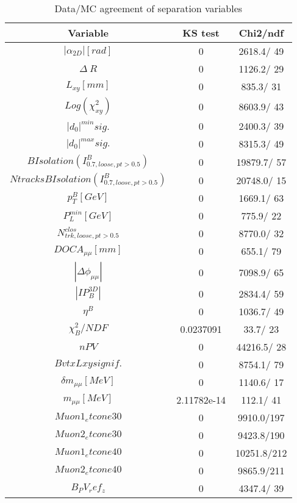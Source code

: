 \documentclass{article}
\begin{document}
\begin{table}[htbp]
\caption{\label{tab:sepVars}Data/MC agreement of separation variables}
\begin{center}
\begin{tabular}{c|c|c}
Variable & KS test & Chi2/ndf \\
\hline
$|\alpha_{2D}| [rad]$ & 0 & 2618.4/ 49\\
\hline
$\Delta~R$ & 0 & 1126.2/ 29\\
\hline
$L_{xy} [mm]$ & 0 & 835.3/ 31\\
\hline
$Log(\chi^{2}_{xy})$ & 0 & 8603.9/ 43\\
\hline
$|d_{0}|^{min} sig.$ & 0 & 2400.3/ 39\\
\hline
$|d_{0}|^{max} sig.$ & 0 & 8315.3/ 49\\
\hline
$B Isolation (I^{B}_{0.7, loose, pt>0.5})$ & 0 & 19879.7/ 57\\
\hline
$Ntracks B Isolation (I^{B}_{0.7, loose, pt>0.5})$ & 0 & 20748.0/ 15\\
\hline
$p_{T}^{B} [GeV]$ & 0 & 1669.1/ 63\\
\hline
$P^{min}_{L} [GeV]$ & 0 & 775.9/ 22\\
\hline
$N^{clos}_{trk, loose, pt>0.5}$ & 0 & 8770.0/ 32\\
\hline
$DOCA_{\mu\mu} [mm]$ & 0 & 655.1/ 79\\
\hline
$|\Delta\phi_{\mu\mu}|$ & 0 & 7098.9/ 65\\
\hline
$|IP_{B}^{3D}|$ & 0 & 2834.4/ 59\\
\hline
$\eta^{B}$ & 0 & 1036.7/ 49\\
\hline
$\chi^{2}_{B}/NDF$ & 0.0237091 &  33.7/ 23\\
\hline
$nPV$ & 0 & 44216.5/ 28\\
\hline
$BvtxLxy signif.$ & 0 & 8754.1/ 79\\
\hline
$\delta m_{\mu\mu} [MeV]$ & 0 & 1140.6/ 17\\
\hline
$m_{\mu\mu} [MeV]$ & 2.11782e-14 & 112.1/ 41\\
\hline
$Muon1_etcone30$ & 0 & 9910.0/197\\
\hline
$Muon2_etcone30$ & 0 & 9423.8/190\\
\hline
$Muon1_etcone40$ & 0 & 10251.8/212\\
\hline
$Muon2_etcone40$ & 0 & 9865.9/211\\
\hline
$B_PV_ref_z$ & 0 & 4347.4/ 39\\
\hline
\end{tabular}
\end{center}
\end{table}
\end{document}
